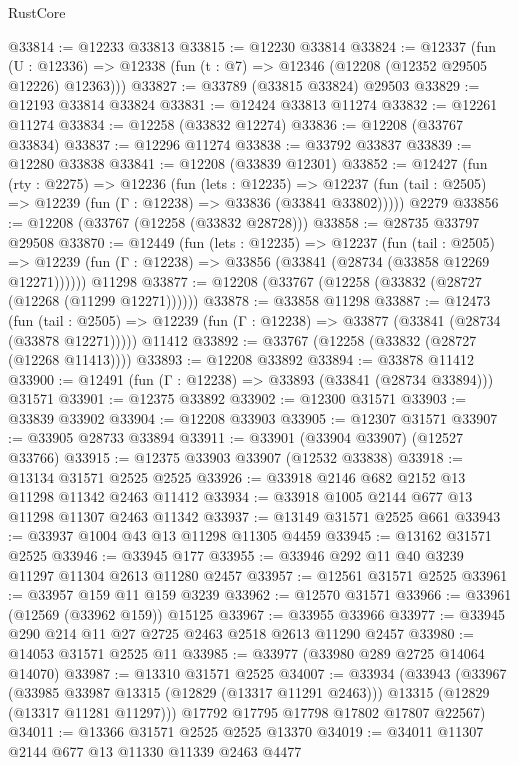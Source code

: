 \begin{lexlean}{RustCore}
\begin{coremodule}
@33814 := @12233 @33813
@33815 := @12230 @33814
@33824 := @12337
    (fun (U : @12336) => @12338 (fun (t : @7) => @12346 (@12208 (@12352 @29505 @12226) @12363)))
@33827 := @33789 (@33815 @33824) @29503
@33829 := @12193 @33814 @33824
@33831 := @12424 @33813 @11274
@33832 := @12261 @11274
@33834 := @12258 (@33832 @12274)
@33836 := @12208 (@33767 @33834)
@33837 := @12296 @11274
@33838 := @33792 @33837
@33839 := @12280 @33838
@33841 := @12208 (@33839 @12301)
@33852 := @12427
    (fun (rty : @2275) =>
    @12236
      (fun (lets : @12235) =>
      @12237 (fun (tail : @2505) => @12239 (fun (Γ : @12238) => @33836 (@33841 @33802)))))
    @2279
@33856 := @12208 (@33767 (@12258 (@33832 @28728)))
@33858 := @28735 @33797 @29508
@33870 := @12449
    (fun (lets : @12235) =>
    @12237
      (fun (tail : @2505) =>
      @12239 (fun (Γ : @12238) => @33856 (@33841 (@28734 (@33858 @12269 @12271))))))
    @11298
@33877 := @12208 (@33767 (@12258 (@33832 (@28727 (@12268 (@11299 @12271))))))
@33878 := @33858 @11298
@33887 := @12473
    (fun (tail : @2505) => @12239 (fun (Γ : @12238) => @33877 (@33841 (@28734 (@33878 @12271)))))
    @11412
@33892 := @33767 (@12258 (@33832 (@28727 (@12268 @11413))))
@33893 := @12208 @33892
@33894 := @33878 @11412
@33900 := @12491 (fun (Γ : @12238) => @33893 (@33841 (@28734 @33894))) @31571
@33901 := @12375 @33892
@33902 := @12300 @31571
@33903 := @33839 @33902
@33904 := @12208 @33903
@33905 := @12307 @31571
@33907 := @33905 @28733 @33894
@33911 := @33901 (@33904 @33907) (@12527 @33766)
@33915 := @12375 @33903 @33907 (@12532 @33838)
@33918 := @13134 @31571 @2525 @2525
@33926 := @33918 @2146 @682 @2152 @13 @11298 @11342 @2463 @11412
@33934 := @33918 @1005 @2144 @677 @13 @11298 @11307 @2463 @11342
@33937 := @13149 @31571 @2525 @661
@33943 := @33937 @1004 @43 @13 @11298 @11305 @4459
@33945 := @13162 @31571 @2525
@33946 := @33945 @177
@33955 := @33946 @292 @11 @40 @3239 @11297 @11304 @2613 @11280 @2457
@33957 := @12561 @31571 @2525
@33961 := @33957 @159 @11 @159 @3239
@33962 := @12570 @31571
@33966 := @33961 (@12569 (@33962 @159)) @15125
@33967 := @33955 @33966
@33977 := @33945 @290 @214 @11 @27 @2725 @2463 @2518 @2613 @11290 @2457
@33980 := @14053 @31571 @2525 @11
@33985 := @33977 (@33980 @289 @2725 @14064 @14070)
@33987 := @13310 @31571 @2525
@34007 := @33934
    (@33943
      (@33967
        (@33985 @33987 @13315 (@12829 (@13317 @11291 @2463)))
        @13315
        (@12829 (@13317 @11281 @11297)))
      @17792
      @17795
      @17798
      @17802
      @17807
      @22567)
@34011 := @13366 @31571 @2525 @2525 @13370
@34019 := @34011 @11307 @2144 @677 @13 @11330 @11339 @2463 @4477

\end{coremodule}
\end{lexlean}
